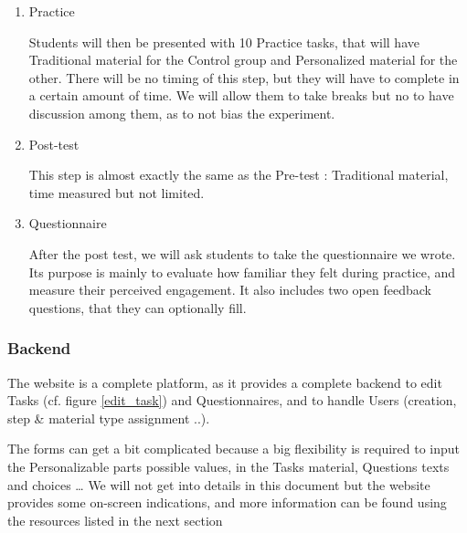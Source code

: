 \documentclass[a4paper,12pt]{article}
\begin{document}
\begin{enumerate}
\item Practice

Students will then be presented with 10 Practice tasks, that will have Traditional material for the Control group and Personalized material for the other. There will be no timing of this step, but they will have to complete in a certain amount of time. We will allow them to take breaks but no to have discussion among them, as to not bias the experiment.

\item Post-test

This step is almost exactly the same as the Pre-test : Traditional material, time measured but not limited.

\item Questionnaire

After the post test, we will ask students to take the questionnaire we wrote. Its purpose is mainly to evaluate how familiar they felt during practice, and measure their perceived engagement.
It also includes two open feedback questions, that they can optionally fill.

\end{enumerate}


\subsubsection{Backend}

The website is a complete platform, as it provides a complete backend to edit Tasks (cf. figure \ref{edit_task}) and Questionnaires, and to handle Users (creation, step \& material type assignment ..).

The forms can get a bit complicated because a big flexibility is required to input the Personalizable parts possible values, in the Tasks material, Questions texts and choices … We will not get into details in this document but the website provides some on-screen indications, and more information can be found using the resources listed in the next section
\end{document}
